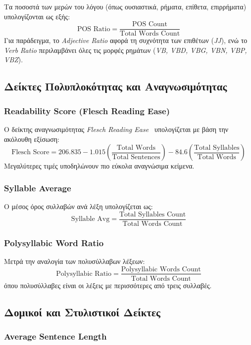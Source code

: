 Τα ποσοστά των μερών του λόγου (όπως ουσιαστικά, ρήματα, επίθετα, επιρρήματα) υπολογίζονται ως εξής:
\[
\text{POS Ratio} = \frac{\text{POS Count}}{\text{Total Words Count}}
\]
Για παράδειγμα, το \textit{Adjective Ratio} αφορά τη συχνότητα των επιθέτων (\textit{JJ}), ενώ το \textit{Verb Ratio} περιλαμβάνει όλες τις μορφές ρημάτων (\textit{VB, VBD, VBG, VBN, VBP, VBZ}).

\subsection{Δείκτες Πολυπλοκότητας και Αναγνωσιμότητας}

\subsubsection{Readability Score (Flesch Reading Ease)}

Ο δείκτης αναγνωσιμότητας \textit{Flesch Reading Ease~\cite{flesch1949art}} υπολογίζεται με βάση την ακόλουθη εξίσωση:
\[
\text{Flesch Score} = 206.835 - 1.015 \left( \frac{\text{Total Words}}{\text{Total Sentences}} \right) - 84.6 \left( \frac{\text{Total Syllables}}{\text{Total Words}} \right)
\]
Μεγαλύτερες τιμές υποδηλώνουν πιο εύκολα αναγνώσιμα κείμενα.

\subsubsection{Syllable Average}

Ο μέσος όρος συλλαβών ανά λέξη υπολογίζεται ως:
\[
\text{Syllable Avg} = \frac{\text{Total Syllables Count}}{\text{Total Words Count}}
\]

\subsubsection{Polysyllabic Word Ratio}

Μετρά την αναλογία των πολυσύλλαβων λέξεων:
\[
\text{Polysyllabic Ratio} = \frac{\text{Polysyllabic Words Count}}{\text{Total Words Count}}
\]
όπου πολυσύλλαβες είναι οι λέξεις με περισσότερες από τρεις συλλαβές.

\subsection{Δομικοί και Στυλιστικοί Δείκτες}

\subsubsection{Average Sentence Length}

